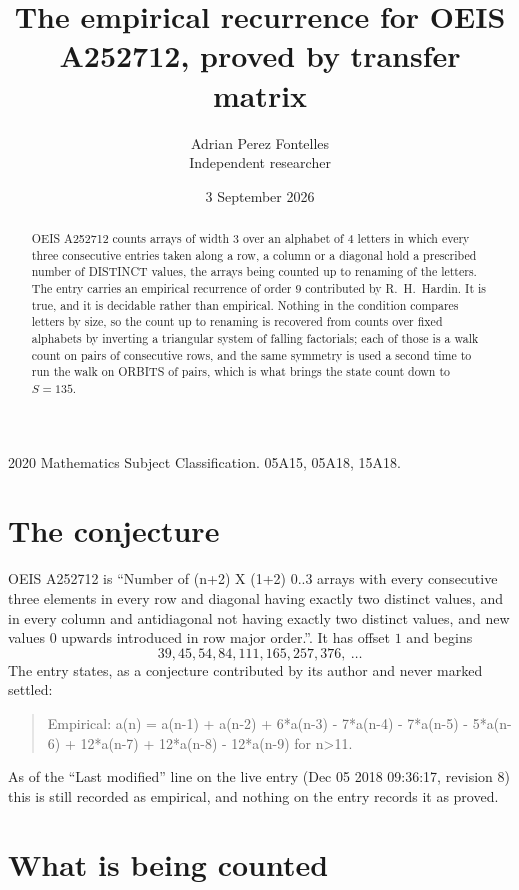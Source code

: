 \documentclass[11pt,a4paper]{article}
\title{The empirical recurrence for OEIS A252712, proved by transfer matrix}
\author{Adrian Perez Fontelles\\ \small Independent researcher}
\date{3 September 2026}
\theoremstyle{plain}
\theoremstyle{definition}
\begin{document}
\maketitle

\begin{abstract}
OEIS A252712 counts arrays of width $3$ over an alphabet of $4$ letters in which every three
consecutive entries taken along a row, a column or a diagonal hold a prescribed number of
DISTINCT values, the arrays being counted up to renaming of the letters. The entry carries an
empirical recurrence of order $9$ contributed by R.~H.~Hardin. It is true, and it is
decidable rather than empirical. Nothing in the condition compares letters by size, so the
count up to renaming is recovered from counts over fixed alphabets by inverting a triangular
system of falling factorials; each of those is a walk count on pairs of consecutive rows, and
the same symmetry is used a second time to run the walk on ORBITS of pairs, which is what
brings the state count down to $S=135$.
\end{abstract}

\noindent\small 2020 Mathematics Subject Classification. 05A15, 05A18, 15A18.\normalsize

\section{The conjecture}

OEIS A252712 is ``Number of (n+2) X (1+2) 0..3 arrays with every consecutive three elements in every row and diagonal having exactly two distinct values, and in every column and antidiagonal not having exactly two distinct values, and new values 0 upwards introduced in row major order.''. It has offset $1$ and begins
\[
39, 45, 54, 84, 111, 165, 257, 376,\ \dots
\]
The entry states, as a conjecture contributed by its author and never marked settled:
\begin{quote}
Empirical: a(n) = a(n-1) + a(n-2) + 6*a(n-3) - 7*a(n-4) - 7*a(n-5) - 5*a(n-6) + 12*a(n-7) + 12*a(n-8) - 12*a(n-9) for n>11.
\end{quote}
As of the ``Last modified'' line on the live entry (Dec 05 2018 09:36:17, revision 8) this is still
recorded as empirical, and nothing on the entry records it as proved.

\section{What is being counted}
\end{document}
